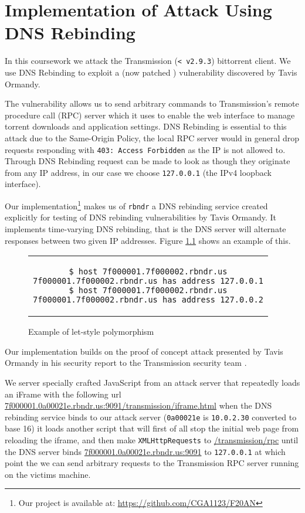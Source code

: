 \chapter{Implementation of Attack Using DNS Rebinding}
\label{implementation}

In this coursework we attack the Transmission (\texttt{< v2.9.3}) bittorrent
client. We use DNS Rebinding to exploit a (now patched \cite{transmission_pr})
vulnerability discovered by Tavis Ormandy.

The vulnerability allows us to send arbitrary commands to Transmission's remote
procedure call (RPC) server which it uses to enable the web interface to manage
torrent downloads and application settings. DNS Rebinding is essential to this
attack due to the Same-Origin Policy, the local RPC server would in general
drop requests responding with \texttt{403: Access Forbidden} as the IP is not
allowed to. Through DNS Rebinding request can be made to look as though they
originate from any IP address, in our case we choose \texttt{127.0.0.1} (the
IPv4 loopback interface).

Our implementation\footnote{Our project is available at:
\url{https://github.com/CGA1123/F20AN}} makes us of \texttt{rbndr} \cite{rbndr}
a DNS rebinding service created explicitly for testing of DNS rebinding
vulnerabilities by Tavis Ormandy. It implements time-varying DNS rebinding,
that is the DNS server will alternate responses between two given IP addresses.
Figure \ref{rbndr_host} shows an example of this.

\begin{figure}[H]
\begin{center}
\begin{tabular}{c}
\begin{lstlisting}
$ host 7f000001.7f000002.rbndr.us
7f000001.7f000002.rbndr.us has address 127.0.0.1
$ host 7f000001.7f000002.rbndr.us
7f000001.7f000002.rbndr.us has address 127.0.0.2
\end{lstlisting}
\end{tabular}
\end{center}
\caption{Example of let-style polymorphism}
\label{rbndr_host}
\end{figure}

Our implementation builds on the proof of concept attack presented by Tavis
Ormandy in his security report to the Transmission security team
\cite{tavis_report}.

We server specially crafted JavaScript from an attack server that repeatedly
loads an iFrame with the following url
\url{7f000001.0a00021e.rbndr.us:9091/transmission/iframe.html} when the DNS
rebinding service binds to our attack server (\texttt{0a00021e} is
\texttt{10.0.2.30} converted to base 16) it loads another script that will
first of all stop the initial web page from reloading the iframe, and then make
\texttt{XMLHttpRequests} to \url{/transmission/rpc} until the DNS server binds
\url{7f000001.0a00021e.rbndr.us:9091} to \texttt{127.0.0.1} at which point the
we can send arbitrary requests to the Transmission RPC server running on the
victims machine.

